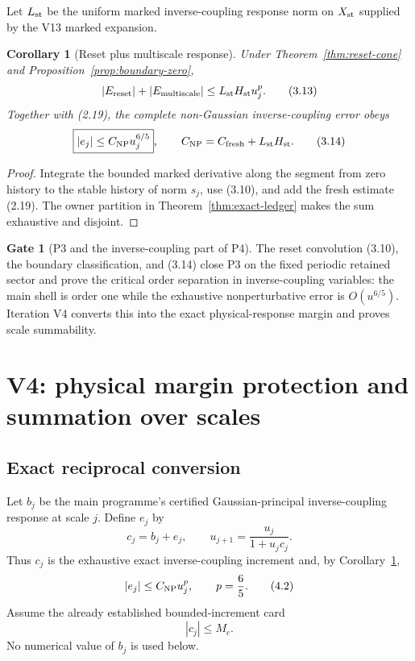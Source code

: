 \documentclass[11pt]{article}
\newtheorem{corollary}[theorem]{Corollary}
\theoremstyle{definition}
\newtheorem{gate}[theorem]{Gate}
\theoremstyle{remark}
\begin{document}
Let $L_{\rm st}$ be the uniform marked inverse-coupling response norm on
$X_{\rm st}$ supplied by the V13 marked expansion.

\begin{corollary}[Reset plus multiscale response]
\label{cor:reset-response}
Under Theorem~\ref{thm:reset-cone} and
Proposition~\ref{prop:boundary-zero},
\[
 |E_{\rm reset}|+|E_{\rm multiscale}|
 \le L_{\rm st}H_{\rm st}u_j^p.                           \tag{3.13}
\]
Together with (2.19), the complete non-Gaussian inverse-coupling error obeys
\[
 \boxed{|e_j|\le C_{\rm NP}u_j^{6/5}},\qquad
 C_{\rm NP}=C_{\rm fresh}+L_{\rm st}H_{\rm st}.          \tag{3.14}
\]
\end{corollary}

\begin{proof}
Integrate the bounded marked derivative along the segment from zero history
to the stable history of norm $s_j$, use (3.10), and add the fresh estimate
(2.19).  The owner partition in Theorem~\ref{thm:exact-ledger} makes the sum
exhaustive and disjoint.
\end{proof}

\begin{gate}[P3 and the inverse-coupling part of P4]
The reset convolution (3.10), the boundary classification, and (3.14) close
P3 on the fixed periodic retained sector and prove the critical order
separation in inverse-coupling variables: the main shell is order one while
the exhaustive nonperturbative error is $O(u^{6/5})$.  Iteration V4 converts
this into the exact physical-response margin and proves scale summability.
\end{gate}

\section{V4: physical margin protection and summation over scales}

\subsection{Exact reciprocal conversion}

Let $b_j$ be the main programme's certified Gaussian-principal
inverse-coupling response at scale $j$.  Define $e_j$ by
\[
 c_j=b_j+e_j,\qquad
 u_{j+1}=\frac{u_j}{1+u_jc_j}.                              \tag{4.1}
\]
Thus $c_j$ is the exhaustive exact inverse-coupling increment and, by
Corollary~\ref{cor:reset-response},
\[
 |e_j|\le C_{\rm NP}u_j^p,\qquad p=\frac65.              \tag{4.2}
\]
Assume the already established bounded-increment card
\[
 |c_j|\le M_c.                                               \tag{4.3}
\]
No numerical value of $b_j$ is used below.
\end{document}
